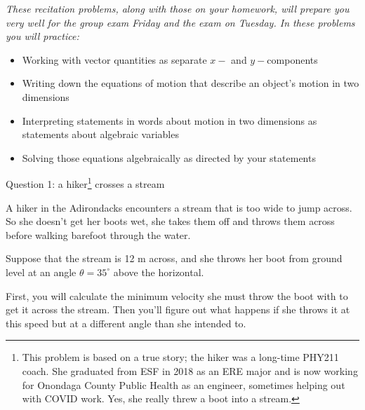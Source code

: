 \documentclass[12pt]{article}
\newcommand{\BI}{\begin{itemize}}
\newcommand{\EI}{\end{itemize}}
\begin{document}
\Large
\centerline{}
\normalsize
\centerline{}

\it These recitation problems, along with those on your homework, will prepare you very well for the group exam Friday and the exam on Tuesday. In these problems you will practice:

\rm

\BI
\item Working with vector quantities as separate $x-$ and $y-$components
\item Writing down the equations of motion that describe an object's motion in two dimensions
\item Interpreting statements in words about motion in two dimensions as statements about algebraic variables
\item Solving those equations algebraically as directed by your statements
\EI



\newpage

\rm 


\centerline{\Large Question 1: a hiker\footnote{\noindent This problem is based on a true story; the hiker was a long-time PHY211 coach. She graduated from ESF in 2018 as an ERE major and is now working for Onondaga County Public Health as an engineer, sometimes helping out with COVID work. Yes, she really threw a boot into a stream.} crosses a stream}     
A hiker in the Adirondacks encounters a stream that is too wide to jump across. So she doesn't get her boots wet, she takes them off and throws them across before walking barefoot through the water. 

Suppose that the stream is 12 m across, and she throws her boot from
ground level at an angle $\theta = 35^\circ$ above the horizontal.

First, you will calculate the minimum velocity she must throw the boot with to get it across the stream. Then you'll figure out what happens if she throws it at this speed but at a different angle than she intended to.
\end{document}
